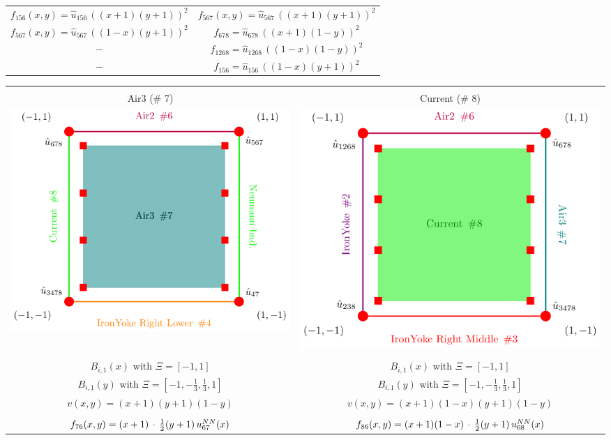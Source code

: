 \documentclass[12pt]{article}
\begin{document}
\begin{tabular}{c|c}
		$f_{156}(x,y)=\hat{u}_{156}\,((x+1)(y+1))^2$ 
		&
		$f_{567}(x,y)=\hat{u}_{567}\,((x+1)(y+1))^2$
		\\
		$f_{567}(x,y) = \hat{u}_{567}\,((1-x)(y+1))^2$ 
		&
		$f_{678} = \hat{u}_{678}\,((x+1)(1-y))^2$
		\\
		$-$ 
		&
		$f_{1268} = \hat{u}_{1268}\,((1-x)(1-y))^2$
		\\
		$-$ 
		&
		$f_{156} = \hat{u}_{156}\,((1-x)(y+1))^2$
		\\
		\hline
		\hline
\end{tabular}


\begin{tabular}{c|c}
\hline \hline \\[-1.25ex]
		Air3 (\# 7) & Current (\# 8) \\
		\hline
		\includegraphics[width=0.5 \linewidth]{./standalones/Air3.pdf} &
		\includegraphics[width=0.5 \linewidth]{./standalones/Current.pdf}		 
		\\
		\hline \\[-0.75ex]
		$B_{i,1}(x)$ with $\Xi = \left[-1,1\right]$ 
		& 
		$B_{i,1}(x)$ with $\Xi = \left[-1,1\right]$
		\\ [0.75ex]
		$B_{i,1}(y)$ with $\Xi = \left[-1,-\frac{1}{3}, \frac{1}{3}, 1\right]$
		& 
		$B_{i,1}(y)$ with $\Xi = \left[-1,-\frac{1}{3}, \frac{1}{3}, 1\right]$
		\\ [0.75ex]
		$v(x,y)=(x+1)(y+1)(1-y)$ 
		&
		$v(x,y)=(x+1)(1-x)(y+1)(1-y)$
		\\ [0.75ex]
		\hline
		\\ [-0.75ex]
		$f_{76}(x,y)= (x+1) \, \cdot \, \frac{1}{2}(y+1) \,u^{\tiny NN}_{67}(x)$ 
		&
		$f_{86}(x,y)= (x+1)(1-x) \, \cdot \, \frac{1}{2}(y+1) \,u^{\tiny NN}_{68}(x)$ 
		\\
		

\end{tabular}
\end{document}
